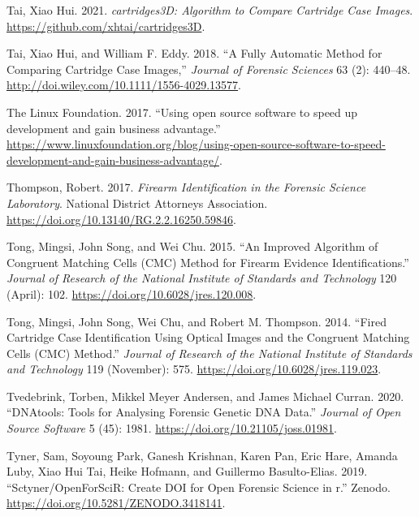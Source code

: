\begin{CSLReferences}{1}{0}
\leavevmode{}%
Tai, Xiao Hui. 2021. \emph{cartridges3D: Algorithm to Compare Cartridge Case Images}. \url{https://github.com/xhtai/cartridges3D}.

\leavevmode{}%
Tai, Xiao Hui, and William F. Eddy. 2018. {``A {Fully} {Automatic} {Method} for {Comparing} {Cartridge} {Case} {Images},''} \emph{Journal of Forensic Sciences} 63 (2): 440--48. \url{http://doi.wiley.com/10.1111/1556-4029.13577}.

\leavevmode{}%
The Linux Foundation. 2017. {``{Using open source software to speed up development and gain business advantage}.''} \url{https://www.linuxfoundation.org/blog/using-open-source-software-to-speed-development-and-gain-business-advantage/}.

\leavevmode{}%
Thompson, Robert. 2017. \emph{Firearm Identification in the Forensic Science Laboratory}. National District Attorneys Association. \url{https://doi.org/10.13140/RG.2.2.16250.59846}.

\leavevmode{}%
Tong, Mingsi, John Song, and Wei Chu. 2015. {``An {Improved} {Algorithm} of {Congruent} {Matching} {Cells} ({CMC}) {Method} for {Firearm} {Evidence} {Identifications}.''} \emph{Journal of Research of the National Institute of Standards and Technology} 120 (April): 102. \url{https://doi.org/10.6028/jres.120.008}.

\leavevmode{}%
Tong, Mingsi, John Song, Wei Chu, and Robert M. Thompson. 2014. {``Fired {Cartridge} {Case} {Identification} {Using} {Optical} {Images} and the {Congruent} {Matching} {Cells} ({CMC}) {Method}.''} \emph{Journal of Research of the National Institute of Standards and Technology} 119 (November): 575. \url{https://doi.org/10.6028/jres.119.023}.

\leavevmode{}%
Tvedebrink, Torben, Mikkel Meyer Andersen, and James Michael Curran. 2020. {``DNAtools: Tools for Analysing Forensic Genetic DNA Data.''} \emph{Journal of Open Source Software} 5 (45): 1981. \url{https://doi.org/10.21105/joss.01981}.

\leavevmode{}%
Tyner, Sam, Soyoung Park, Ganesh Krishnan, Karen Pan, Eric Hare, Amanda Luby, Xiao Hui Tai, Heike Hofmann, and Guillermo Basulto-Elias. 2019. {``Sctyner/OpenForSciR: Create DOI for Open Forensic Science in r.''} Zenodo. \url{https://doi.org/10.5281/ZENODO.3418141}.


\end{CSLReferences}
